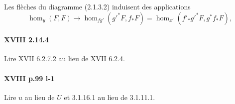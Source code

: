 Les flèches du diagramme (2.1.3.2) induisent des applications 
\[
  \hom_y(F,F) \to \hom_{f g'}({g'}^\ast F,f_\ast F) = \hom_{x'}(f'_\ast {g'}^\ast F,g^\ast f_\ast F) \text{,}
\]

\paragraph{XVIII 2.14.4}
Lire XVII 6.2.7.2 au lieu de XVII 6.2.4.

\paragraph{XVIII p.99 l-1}
Lire $u$ au lieu de $U$ et 3.1.16.1 au lieu de 3.1.11.1.

